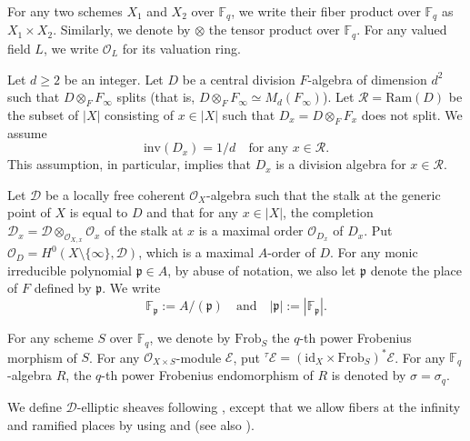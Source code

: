 \documentclass[10pt]{amsart}
\theoremstyle{plain}
\theoremstyle{definition}
\newcommand{\id}{\mathrm{id}}
\newcommand{\inv}{\mathrm{inv}}
\newcommand{\Ram}{\mathrm{Ram}}
\newcommand{\cE}{\mathcal{E}}
\newcommand{\cO}{\mathcal{O}}
\newcommand{\cR}{\mathcal{R}}
\newcommand{\Frob}{\mathrm{Frob}}
\newcommand{\bF}{\mathbb{F}}
\newcommand{\sD}{\mathscr{D}}
\newcommand{\frp}{\mathfrak{p}}
\begin{document}
For any two schemes $X_1$ and $X_2$ over $\bF_q$, we write their fiber product over $\bF_q$ as $X_1 \times X_2$.
Similarly, we denote by $\otimes$ the tensor product over $\bF_q$. For any valued field $L$, we write $\cO_L$ for its valuation ring.


Let $d\geq 2$ be an integer. Let $D$ be a central division $F$-algebra of dimension $d^2$ such that $D\otimes_F F_\infty$ splits
(that is, $D\otimes_F F_\infty \simeq M_d(F_\infty)$). 
Let $\cR=\Ram(D)$ be the subset of $|X|$ consisting of $x\in |X|$ such that $D_x=D\otimes_F F_x$ does not split.
We assume
\begin{equation}\label{EqnAssumpDx}
\inv(D_x)=1/d\quad\text{for any }x\in \cR.
\end{equation}
This assumption, in particular, implies that $D_x$ is a division algebra for $x\in \cR$.

Let $\sD$ be a locally free coherent $\cO_X$-algebra such that the stalk at the generic point of $X$ is equal to $D$ and that
for any $x\in |X|$, the completion $\sD_x=\sD\otimes_{\cO_{X,x}}\cO_x$ of the stalk at $x$ is a maximal order $\cO_{D_x}$ of $D_x$.  
Put $\cO_D=H^0(X\setminus\{\infty\},\sD)$, which is a maximal $A$-order of $D$.
For any monic irreducible polynomial $\frp\in A$, by abuse of notation, we also let $\frp$ denote the place of $F$ defined by $\frp$.
We write
\[
\bF_\frp:=A/(\frp)\quad\text{and}\quad |\frp|:=|\bF_\frp|.
\]

For any scheme $S$ over $\bF_q$, we denote by $\Frob_S$ the $q$-th power Frobenius morphism of $S$. For any $\cO_{X\times S}$-module $\cE$,
put ${}^\tau\!\cE=(\id_X\times \Frob_S)^*\cE$. For any $\bF_q$-algebra $R$, the $q$-th power Frobenius endomorphism of $R$ is denoted by $\sigma=\sigma_q$.

We define $\sD$-elliptic sheaves following \cite[Definition 2.2]{LRS}, 
except that we allow fibers at the infinity and ramified places by using \cite[Definition 4.4.1]{BS} and \cite[D\'{e}finition 3.5]{Hau}
(see also \cite[Definition 5.9]{Spi}).
\end{document}
